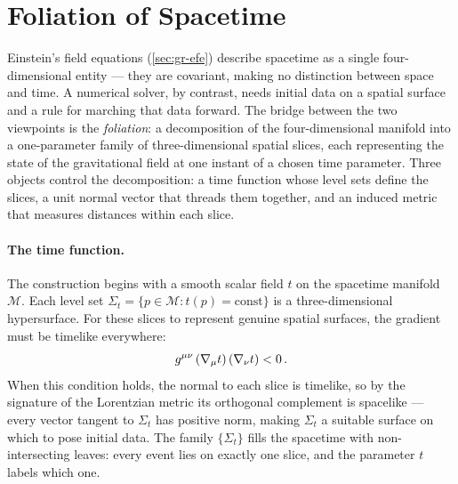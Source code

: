 \section{Foliation of Spacetime}
\label{sec:adm-foliation}

Einstein's field equations (\cref{sec:gr-efe}) describe spacetime as a
single four-dimensional entity --- they are covariant, making no
distinction between space and time.  A numerical solver, by contrast,
needs initial data on a spatial surface and a rule for marching that data
forward.  The bridge between the two viewpoints is the \emph{foliation}: a
decomposition of the four-dimensional manifold into a one-parameter family
of three-dimensional spatial slices, each representing the state of the
gravitational field at one instant of a chosen time parameter.  Three
objects control the decomposition: a time function whose level sets define
the slices, a unit normal vector that threads them together, and an
induced metric that measures distances within each slice.

\paragraph{The time function.}

The construction begins with a smooth scalar field $t$ on the spacetime
manifold $\mathcal{M}$.  Each level set
$\Sigma_t = \{p \in \mathcal{M} : t(p) = \text{const}\}$ is a
three-dimensional hypersurface.  For these slices to represent genuine
spatial surfaces, the gradient must be timelike everywhere:
%
\begin{equation}
  g^{\mu\nu} \,(\nabla_{\mu} t)\,(\nabla_{\nu} t) < 0 \,.
  \label{eq:adm-time-function}
\end{equation}
%
When this condition holds, the normal to each slice is timelike, so by the
signature of the Lorentzian metric its orthogonal complement is spacelike
--- every vector tangent to $\Sigma_t$ has positive norm, making
$\Sigma_t$ a suitable surface on which to pose initial data.  The family
$\{\Sigma_t\}$ fills the spacetime with
non-intersecting leaves: every event lies on exactly one slice, and the
parameter $t$ labels which one.

